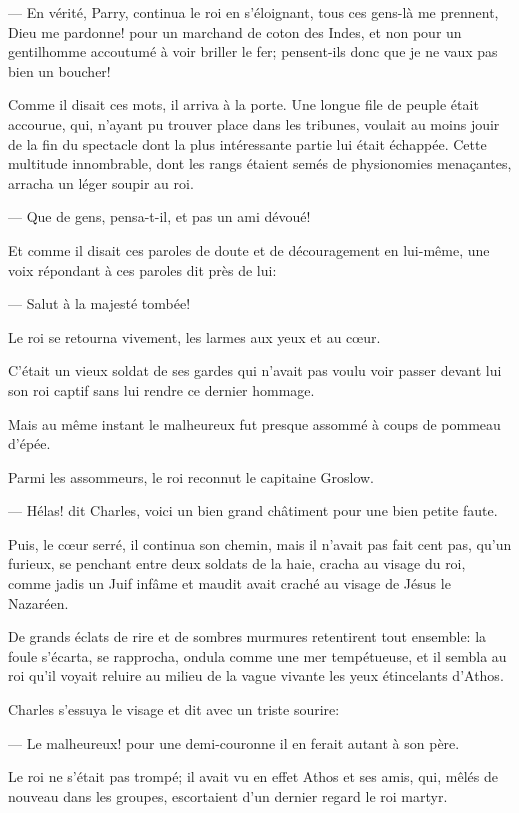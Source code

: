 — En vérité, Parry, continua le roi en s'éloignant, tous ces gens-là me prennent, Dieu me pardonne! pour un marchand de coton des Indes, et non pour un gentilhomme accoutumé à voir briller le fer; pensent-ils donc que je ne vaux pas bien un boucher!

Comme il disait ces mots, il arriva à la porte. Une longue file de peuple était accourue, qui, n'ayant pu trouver place dans les tribunes, voulait au moins jouir de la fin du spectacle dont la plus intéressante partie lui était échappée. Cette multitude innombrable, dont les rangs étaient semés de physionomies menaçantes, arracha un léger soupir au roi.

— Que de gens, pensa-t-il, et pas un ami dévoué!

Et comme il disait ces paroles de doute et de découragement en lui-même, une voix répondant à ces paroles dit près de lui:

— Salut à la majesté tombée!

Le roi se retourna vivement, les larmes aux yeux et au cœur.

C'était un vieux soldat de ses gardes qui n'avait pas voulu voir passer devant lui son roi captif sans lui rendre ce dernier hommage.

Mais au même instant le malheureux fut presque assommé à coups de pommeau d'épée.

Parmi les assommeurs, le roi reconnut le capitaine Groslow.

— Hélas! dit Charles, voici un bien grand châtiment pour une bien petite faute.

Puis, le cœur serré, il continua son chemin, mais il n'avait pas fait cent pas, qu'un furieux, se penchant entre deux soldats de la haie, cracha au visage du roi, comme jadis un Juif infâme et maudit avait craché au visage de Jésus le Nazaréen.

De grands éclats de rire et de sombres murmures retentirent tout ensemble: la foule s'écarta, se rapprocha, ondula comme une mer tempétueuse, et il sembla au roi qu'il voyait reluire au milieu de la vague vivante les yeux étincelants d'Athos.

Charles s'essuya le visage et dit avec un triste sourire:

— Le malheureux! pour une demi-couronne il en ferait autant à son père.

Le roi ne s'était pas trompé; il avait vu en effet Athos et ses amis, qui, mêlés de nouveau dans les groupes, escortaient d'un dernier regard le roi martyr.

